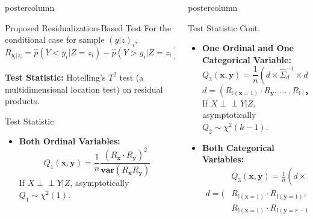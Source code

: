 \documentclass{beamer}
\def\ci{\perp\!\!\!\!\!\perp}
\newlength{\columnheight}
\begin{document}
\begin{frame}
\begin{columns}
\begin{column}{.33\textwidth}
\begin{beamercolorbox}[center]{postercolumn}
\begin{minipage}{.98\textwidth}
{\begin{myblock}{Proposed Residualization-Based Test}
				For the conditional case for sample $ (y|z)_i $,
				$$ R_{y_i | z_i} = \hat{p}(Y < y_i | Z=z_i) - \hat{p}(Y>y_i|Z=z_i) $$ \\
				\vspace{0.8em}
		\justifying \textbf{Test Statistic:} Hotelling's $ T^2 $ test
				(a multidimensional location test) on residual
				products.
	\end{myblock}\vfill
	\begin{myblock}{Test Statistic}
		\begin{itemize}
			\item \textbf{Both Ordinal Variables:}
			$$ Q_1(\bm{x}, \bm{y}) = \frac{1}{n} \frac{(R_{\bm{x}} \cdot R_{\bm{y}})^2}{\bm{var}(R_{\bm{x}} R_{\bm{y}})} $$
			If $ X \ci Y | Z $, asymptotically $ Q_1 \sim \chi^2(1) $.
		\end{itemize}
	\end{myblock}\vfill
		}\end{minipage}\end{beamercolorbox}
	\end{column}


	\begin{column}{.33\textwidth}
		\begin{beamercolorbox}[center]{postercolumn}
			\begin{minipage}{.98\textwidth} %
				\parbox[t][\columnheight]{\textwidth}{ %
	\begin{myblock}{Test Statistic Cont.}
		\begin{itemize}
			\item \textbf{One Ordinal and One Categorical Variable:}
						$$ Q_2(\bm{x}, \bm{y}) = \frac{1}{n} (d \times \hat{\Sigma}_d^{-1} \times d^T) $$
						$$ d = (R_{\mathbb{I}(\mathbf{x}=1)} \cdot R_{\mathbf{y}}, \, \ldots \ , R_{\mathbb{I}(\mathbf{x}=k-1)} \cdot R_{\mathbf{y}}) $$
				If $ X \ci Y | Z $, asymptotically $ Q_2 \sim \chi^2(k-1) $.
			\item \textbf{Both Categorical Variables:}
			\begin{equation*}
				\begin{split}
					& Q_3(\bm{x}, \bm{y}) = \frac{1}{n} (d \times \hat{\Sigma}_d^{-1} \times d^T) \\
				d = (&R_{\mathbb{I}(\mathbf{x}=1)} \cdot R_{\mathbb{I}(\mathbf{y}=1)}, \, \ldots \ ,
						R_{\mathbb{I}(\mathbf{x}=k-1)} R_{\mathbb{I}(\mathbf{y}=1)}, \, \ldots \, , \\
				     &R_{\mathbb{I}(\mathbf{x}=1)} \cdot R_{\mathbb{I}(\mathbf{y}=r-1)}, \, \ldots \ ,
						R_{\mathbb{I}(\mathbf{x}=k-1)} R_{\mathbb{I}(\mathbf{y}=r-1)}) 
				\end{split}
			\end{equation*}
			

\end{itemize}
\end{myblock}}
\end{minipage}
\end{beamercolorbox}
\end{column}
\end{columns}
\end{frame}
\end{document}
